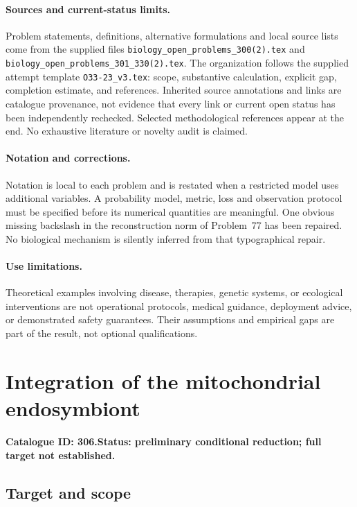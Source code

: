 \documentclass[11pt]{article}
\begin{document}
\paragraph{Sources and current-status limits.}
Problem statements, definitions, alternative formulations and local source lists
come from the supplied files
\texttt{biology\_open\_problems\_300(2).tex} and
\texttt{biology\_open\_problems\_301\_330(2).tex}.
The organization follows the supplied attempt template
\texttt{O33-23\_v3.tex}: scope, substantive calculation, explicit gap,
completion estimate, and references. Inherited source annotations and links are
catalogue provenance, not evidence that every link or current open status has
been independently rechecked. Selected methodological references appear at the
end. No exhaustive literature or novelty audit is claimed.

\paragraph{Notation and corrections.}
Notation is local to each problem and is restated when a restricted model uses
additional variables. A probability model, metric, loss and observation protocol
must be specified before its numerical quantities are meaningful. One obvious
missing backslash in the reconstruction norm of Problem~77 has been repaired.
No biological mechanism is silently inferred from that typographical repair.

\paragraph{Use limitations.}
Theoretical examples involving disease, therapies, genetic systems, or ecological
interventions are not operational protocols, medical guidance, deployment advice,
or demonstrated safety guarantees. Their assumptions and empirical gaps are part
of the result, not optional qualifications.

\setcounter{section}{305}
\section{Integration of the mitochondrial endosymbiont}
\label{prob:306}
\noindent\textbf{Catalogue ID: 306.}\quad \textbf{Status: preliminary conditional reduction; full target not established.}
\subsection{Target and scope}
\end{document}
